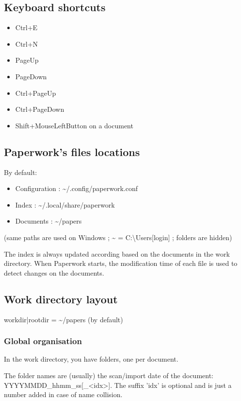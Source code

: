 \documentclass[10pt,a4paper]{article}
\begin{document}
\subsection{Keyboard shortcuts}
\begin{itemize}
\item Ctrl+E
\item Ctrl+N
\item PageUp
\item PageDown
\item Ctrl+PageUp
\item Ctrl+PageDown
\item Shift+MouseLeftButton on a document
\end{itemize}

\subsection{Paperwork's files locations}

By default:
\begin{itemize}
\item Configuration : \textasciitilde /.config/paperwork.conf
\item Index : \textasciitilde /.local/share/paperwork
\item Documents : \textasciitilde /papers
\end{itemize}
(same paths are used on Windows ; \textasciitilde{} = C:\textbackslash Users{[}login{]}
; folders are hidden)

The index is always updated according based on the documents in the
work directory. When Paperwork starts, the modification time of each
file is used to detect changes on the documents.

\subsection{Work directory layout}

workdir|rootdir = \textasciitilde /papers (by default)

\subsubsection{Global organisation}

In the work directory, you have folders, one per document.

The folder names are (usually) the scan/import date of the document:
YYYYMMDD\_hhmm\_ss{[}\_<idx>{]}. The suffix 'idx' is optional and
is just a number added in case of name collision.
\end{document}
